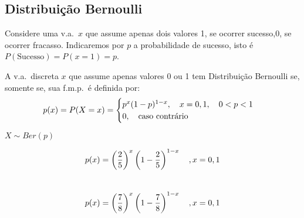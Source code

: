  \subsection{Distribuição Bernoulli}
 \begin{description}
   \item Considere uma v.a.\ $x$ que assume apenas dois valores 1, se ocorrer sucesso,$0$, se ocorrer fracasso. Indicaremos por $p$ a probabilidade de sucesso, isto é $P(\text{Sucesso})=P(x=1)=p$.

\item [Definição:] A v.a.\ discreta $x$ que assume apenas valores 0 ou 1 tem Distribuição
 Bernoulli se, somente se, sua f.m.p.\ é definida por:
 \begin{align}
   p(x)=P(X=x)= \begin{cases}
     p^{x}(1-p)^{1-x}, \text{\quad} x=0,1, \text{\quad} 0<p<1\\
     0, \text{\quad caso contrário}
   \end{cases}
 \end{align}
\item[ Notação:] $X \sim Ber(p)$

\item [Exemplos:]
  $$p(x)=\left(\frac{2}{5}\right)^x\left(1-\frac{2}{5}\right)^{1-x} \text{\quad},x=0,1$$\\
 $$p(x)=\left(\frac{7}{8}\right)^{x}\left(1-\frac{7}{8}\right)^{1-x} \text{\quad }, x=0,1$$


\end{description}

